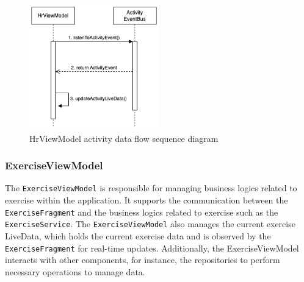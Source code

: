 \begin{figure}[H]
    \centering
    \includegraphics[width=0.5\textwidth]{diagrams/hrviewmodel-activity.drawio.png}
    \caption{HrViewModel activity data flow sequence diagram}
    \label{fig:hrviewmodel_activitydata}
\end{figure}

\subsubsection{ExerciseViewModel}
\label{chap:exerciseviewmodel_design}
The \texttt{ExerciseViewModel} is responsible for managing business logics related to exercise within the application.
It supports the communication between the \texttt{ExerciseFragment} and the business logics related to exercise such as the \texttt{ExerciseService}.
The \texttt{ExerciseViewModel} also manages the current exercise LiveData, which holds the current exercise data and is observed by the \texttt{ExerciseFragment} for real-time updates. 
Additionally, the ExerciseViewModel interacts with other components, for instance, the repositories to perform necessary operations to manage data.


